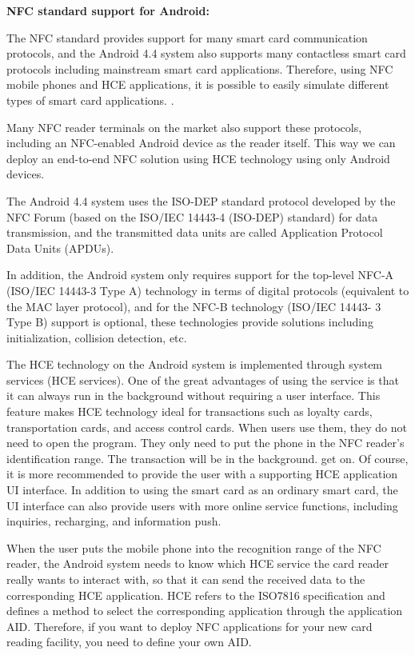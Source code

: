 \documentclass[journal]{IEEEtran}
\begin{document}
\textbf{NFC standard support for Android:}

The NFC standard provides support for many smart card communication protocols, and the Android 4.4 system also supports many contactless smart card protocols including mainstream smart card applications. Therefore, using NFC mobile phones and HCE applications, it is possible to easily simulate different types of smart card applications. .

Many NFC reader terminals on the market also support these protocols, including an NFC-enabled Android device as the reader itself. This way we can deploy an end-to-end NFC solution using HCE technology using only Android devices.

The Android 4.4 system uses the ISO-DEP standard protocol developed by the NFC Forum (based on the ISO/IEC 14443-4 (ISO-DEP) standard) for data transmission, and the transmitted data units are called Application Protocol Data Units (APDUs).

In addition, the Android system only requires support for the top-level NFC-A (ISO/IEC 14443-3 Type A) technology in terms of digital protocols (equivalent to the MAC layer protocol), and for the NFC-B technology (ISO/IEC 14443- 3 Type B) support is optional, these technologies provide solutions including initialization, collision detection, etc.

The HCE technology on the Android system is implemented through system services (HCE services). One of the great advantages of using the service is that it can always run in the background without requiring a user interface. This feature makes HCE technology ideal for transactions such as loyalty cards, transportation cards, and access control cards. When users use them, they do not need to open the program. They only need to put the phone in the NFC reader's identification range. The transaction will be in the background. get on. Of course, it is more recommended to provide the user with a supporting HCE application UI interface. In addition to using the smart card as an ordinary smart card, the UI interface can also provide users with more online service functions, including inquiries, recharging, and information push.

When the user puts the mobile phone into the recognition range of the NFC reader, the Android system needs to know which HCE service the card reader really wants to interact with, so that it can send the received data to the corresponding HCE application. HCE refers to the ISO7816 specification and defines a method to select the corresponding application through the application AID. Therefore, if you want to deploy NFC applications for your new card reading facility, you need to define your own AID.
\end{document}
